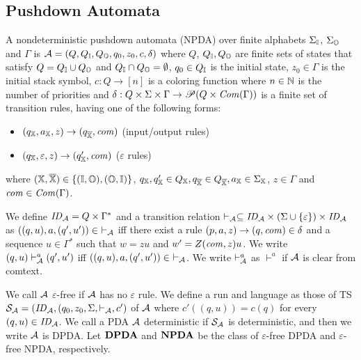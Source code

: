 \subsection{Pushdown Automata}

\begin{definition}
A nondeterministic {pushdown automata} (NPDA) over finite alphabets $\Sigma_{\mathbb{I}}$, $\Sigma_{\mathbb{O}}$ and $\Gamma$ is ${\cal A} = (Q, Q_{\mathbb{I}}, Q_{\mathbb{O}}, q_0, z_0, c, \delta)$ where
$Q$, $Q_{\mathbb{I}}, Q_{\mathbb{O}}$ are finite sets of states that satisfy $Q=Q_{\mathbb{I}}\cup Q_{\mathbb{O}}$ and $Q_{\mathbb{I}} \cap Q_{\mathbb{O}} = \emptyset$,
$q_0\in Q_{\mathbb{I}}$ is the initial state,
$z_0\in \Gamma$ is the initial stack symbol,
$c: Q \to [n]$ is a coloring function where $n\in \mathbb{N}$ is the number of priorities and
$\delta: Q \times \Sigma \times \Gamma \to \mathscr{P}(Q \times \mathit{Com}(\Gamma))$ is a finite set of transition rules, having one of the following forms:
\begin{itemize}
\item $(q_{\mathbb{X}}, a_{\mathbb{X}}, z) \rightarrow (q_{\overline{{\mathbb{X}}}}, \mathit{com})$ (input/output rules)
\item $(q_{\mathbb{X}}, \varepsilon, z)\to(q'_{\mathbb{X}},\mathit{com})$ ($\varepsilon$ rules)
\end{itemize}
where $({\mathbb{X}}, {\overline{{\mathbb{X}}}})\in\{({\mathbb{I}}, {\mathbb{O}}), ({\mathbb{O}},{\mathbb{I}})\}$,
$q_{\mathbb{X}}, q'_{\mathbb{X}}\in Q_{\mathbb{X}}, q_{\overline{{\mathbb{X}}}}\in Q_{\overline{{\mathbb{X}}}}, a_{\mathbb{X}}\in \Sigma_{\mathbb{X}}$, $z\in \Gamma$ and $\mathit{com}\in \mathit{Com}(\Gamma)$.
\end{definition}
We define $\mathit{ID}_{\cal A}= Q\times \Gamma^*$ and
a transition relation $\vdash_{\cal A}\subseteq \mathit{ID}_{\cal A}\times (\Sigma\cup\{\varepsilon\})\times \mathit{ID}_{\cal A}$ as
$((q,u),a,(q',u'))\in\ \vdash_{\cal A}$ iff there exist a rule $(p, a, z) \rightarrow (q, \mathit{com}) \in \delta$ and a sequence $u\in \Gamma^*$ such that $w=zu$ and $w'=Z(\mathit{com},z)u$.
We write $(q,u)\vdash^a_{\cal A}(q',u')$ iff
$((q,u),a,(q',u'))\in\ \vdash_{\cal A}$.
We write $\vdash^{a}_{\cal A}$ as $\vdash^{a}$ if ${\cal A}$ is clear from comtext.

We call ${\cal A}$ $\varepsilon$-free if ${\cal A}$ has no $\varepsilon$ rule.
We define a run and language as those of TS ${\cal S}_{\cal A}=(\mathit{ID}_{\cal A}, (q_0,z_0,\Sigma,\vdash_{\cal A},c')$ of ${\cal A}$ where $c'((q,u))= c(q)$ for every $(q,u)\in\mathit{ID}_{\cal A}$.
We call a PDA ${\cal A}$ deterministic if ${\cal S}_{\cal A}$ is deterministic,
and then we write ${\cal A}$ is DPDA.
Let ${\bf DPDA}$ and ${\bf NPDA}$ be the class of $\varepsilon$-free DPDA and $\varepsilon$-free NPDA, respectively.


